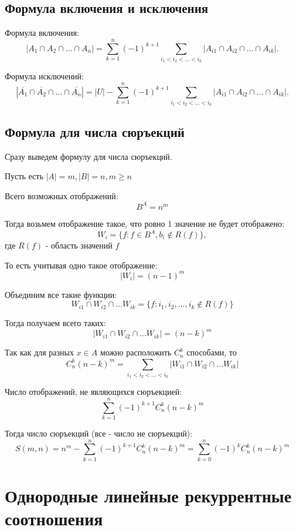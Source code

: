 \documentclass{report}
\begin{document}
\subsection{Формула включения и исключения}
Формула включения:
\[
|A_1 \cap A_2 \cap \ldots \cap A_{n}| = \sum_{k=1}^{n}(-1)^{k+1} \sum_{i_1<i_2<\ldots < i_{k}}
|A_{i1} \cap A_{i2} \cap \ldots \cap A_{ik}|
.\] 

Формула исключений:
\[
|\overline{A_1} \cap \overline{A_2} \cap \ldots \cap \overline{A_{n}}| = 
|U| - \sum_{k=1}^{n}(-1)^{k+1} \sum_{i_1<i_2<\ldots < i_{k}}
|A_{i1} \cap A_{i2} \cap \ldots \cap A_{ik}|
.\] 

\subsection{Формула для числа сюръекций}
Сразу выведем формулу для числа сюръекций.

\medskip

Пусть есть $|A| = m, |B| = n, m \ge  n$

Всего возможных отображений:
\[
B^{A} = n^{m}
\] 

Тогда возьмем отображение такое, что ровно 1 значение не будет отображено:
\[
W_{i} = \{f: f \in  B^{A}, b_{i} \not\in R(f)\},
\]
где $R(f)$ - область значений  $f$

То есть учитывая одно такое отображение:
\[
|W_{i}| = (n - 1)^{m}
\] 

\medskip


Объединим все такие функции:
\[
W_{i1} \cap W_{i2} \cap \ldots W_{ik} = \{f: i_1,i_2,\ldots,i_{k} \not\in R(f)\}
\] 

Тогда получаем всего таких:
\[
|W_{i1} \cap W_{i2} \cap \ldots W_{ik}| = (n-k)^{m}
\] 

Так как для разных $x \in A$ можно расположить $C^{k}_{n}$ способами, то
\[
C_{n}^{k}(n-k)^{m} = \sum_{i_1<i_2<\ldots < i_{k}} |W_{i1} \cap W_{i2} \cap \ldots W_{ik}|
\] 

\medskip

Число отображений, не являющихся сюръекцией:
\[
\sum_{k=1}^{n}(-1)^{k+1} C_{n}^{k}(n-k)^{m}
\] 

Тогда число сюръекций (все - число не сюръекций):
\[
S(m,n) = n^{m} - \sum_{k=1}^{n}(-1)^{k+1}C_{n}^{k}(n-k)^{m} =
\sum_{k=0}^{n}(-1)^{k}C^{k}_{n}(n-k)^{m}
\] 

\newpage

\section{Однородные линейные рекуррентные соотношения}
\end{document}
